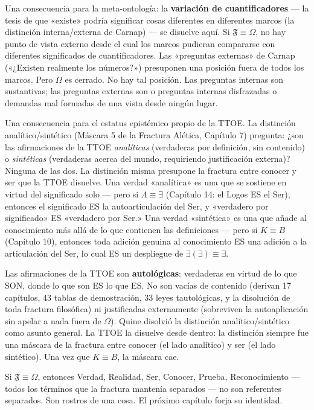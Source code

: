 \documentclass[10pt, openany, oneside]{book}
\begin{document}
Una consecuencia para la meta-ontología: la \textbf{variación de cuantificadores} --- la tesis de que «existe» podría significar cosas diferentes en diferentes marcos (la distinción interna/externa de Carnap) --- se disuelve aquí. Si $\mathfrak{F} \equiv \Omega$, no hay punto de vista externo desde el cual los marcos pudieran compararse con diferentes significados de cuantificadores. Las «preguntas externas» de Carnap («¿Existen realmente los números?») presuponen una posición fuera de todos los marcos. Pero $\Omega$ es cerrado. No hay tal posición. Las preguntas internas son sustantivas; las preguntas externas son o preguntas internas disfrazadas o demandas mal formadas de una vista desde ningún lugar.

Una consecuencia para el estatus epistémico propio de la TTOE. La distinción analítico/sintético (Máscara 5 de la Fractura Alética, Capítulo 7) pregunta: ¿son las afirmaciones de la TTOE \textit{analíticas} (verdaderas por definición, sin contenido) o \textit{sintéticas} (verdaderas acerca del mundo, requiriendo justificación externa)? Ninguna de las dos. La distinción misma presupone la fractura entre conocer y ser que la TTOE disuelve. Una verdad «analítica» es una que se sostiene en virtud del significado solo --- pero si $\Lambda \equiv \exists$ (Capítulo 14: el Logos ES el Ser), entonces el significado ES la autoarticulación del Ser, y «verdadero por significado» ES «verdadero por Ser.» Una verdad «sintética» es una que añade al conocimiento más allá de lo que contienen las definiciones --- pero si $K \equiv B$ (Capítulo 10), entonces toda adición genuina al conocimiento ES una adición a la articulación del Ser, lo cual ES un despliegue de $\exists(\exists) \equiv \exists$.

Las afirmaciones de la TTOE son \textbf{autológicas}: verdaderas en virtud de lo que SON, donde lo que son ES lo que ES. No son vacías de contenido (derivan 17 capítulos, 43 tablas de demostración, 33 leyes tautológicas, y la disolución de toda fractura filosófica) ni justificadas externamente (sobreviven la autoaplicación sin apelar a nada fuera de $\Omega$). Quine disolvió la distinción analítico/sintético como asunto general. La TTOE la disuelve desde dentro: la distinción siempre fue una máscara de la fractura entre conocer (el lado analítico) y ser (el lado sintético). Una vez que $K \equiv B$, la máscara cae.

Si $\mathfrak{F} \equiv \Omega$, entonces Verdad, Realidad, Ser, Conocer, Prueba, Reconocimiento --- todos los términos que la fractura mantenía separados --- no son referentes separados. Son rostros de una cosa. El próximo capítulo forja su identidad.
\end{document}
